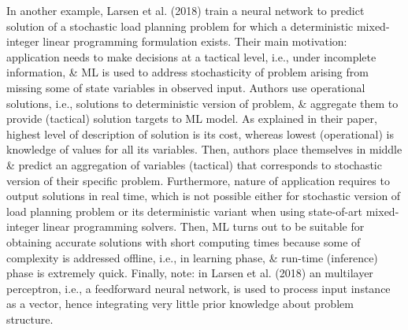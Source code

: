 \documentclass{article}
\begin{document}
\begin{itemize}
\begin{itemize}
\begin{itemize}
            In another example, Larsen et al. (2018) train a neural network to predict solution of a stochastic load planning problem for which a deterministic mixed-integer linear programming formulation exists. Their main motivation: application needs to make decisions at a tactical level, i.e., under incomplete information, \& ML is used to address stochasticity of problem arising from missing some of state variables in observed input. Authors use operational solutions, i.e., solutions to deterministic version of problem, \& aggregate them to provide (tactical) solution targets to ML model. As explained in their paper, highest level of description of solution is its cost, whereas lowest (operational) is knowledge of values for all its variables. Then, authors place themselves in middle \& predict an aggregation of variables (tactical) that corresponds to stochastic version of their specific problem. Furthermore, nature of application requires to output solutions in real time, which is not possible either for stochastic version of load planning problem or its deterministic variant when using state-of-art mixed-integer linear programming solvers. Then, ML turns out to be suitable for obtaining accurate solutions with short computing times because some of complexity is addressed offline, i.e., in learning phase, \& run-time (inference) phase is extremely quick. Finally, note: in Larsen et al. (2018) an multilayer perceptron, i.e., a feedforward neural network, is used to process input instance as a vector, hence integrating very little prior knowledge about problem structure.


\end{itemize}
\end{itemize}
\end{itemize}
\end{document}
